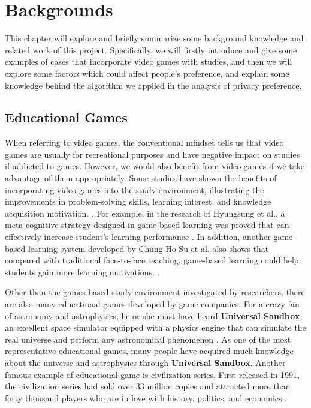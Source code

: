 \documentclass[msc,deptreport,ai]{infthesis}      %
\begin{document}

\chapter{Backgrounds}

This chapter will explore and briefly summarize some background knowledge and related work of this project. Specifically, we will firstly introduce and give some examples of cases that incorporate video games with studies, and then we will explore some factors which could affect people's preference, and explain some knowledge behind the algorithm we applied in the analysis of privacy preference.

\section{Educational Games}

When referring to video games, the conventional mindset tells us that video games are usually for recreational purposes and have negative impact on studies if addicted to games. However, we would also benefit from video games if we take advantage of them appropriately. Some studies have shown the benefits of incorporating video games into the study environment, illustrating the improvements in problem-solving skills, learning interest, and knowledge acquisition motivation. \cite{unknown, KIM2009800, CHENG2012669}. For example, in the research of Hyungsung et al., a meta-cognitive strategy designed in game-based learning was proved that can effectively increase student's learning performance \cite{KIM2009800}. In addition, another game-based learning system developed by Chung-Ho Su et al. also shows that compared with traditional face-to-face teaching, game-based learning could help students gain more learning motivations. \cite{CHENG2012669}.

Other than the games-based study environment investigated by researchers, there are also many educational games developed by game companies. For a crazy fan of astronomy and astrophysics, he or she must have heard \textbf{Universal Sandbox}, an excellent space simulator equipped with a physics engine that can simulate the real universe and perform any astronomical phenomenon \cite{Universe}. As one of the most representative educational games, many people have acquired much knowledge about the universe and astrophysics through \textbf{Universal Sandbox}. Another famous example of educational game is civilization series. First released in 1991, the civilization series had sold over 33 million copies and attracted more than forty thousand players who are in love with history, politics, and economics \cite{Civilization}.
\end{document}
